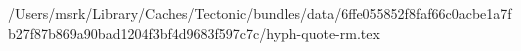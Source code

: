 /Users/msrk/Library/Caches/Tectonic/bundles/data/6ffe055852f8faf66c0acbe1a7fb27f87b869a90bad1204f3bf4d9683f597c7c/hyph-quote-rm.tex
